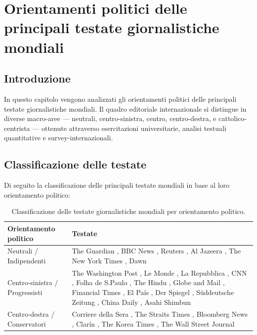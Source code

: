 \chapter{Orientamenti politici delle principali testate giornalistiche mondiali}
\label{chap:orientamenti_press}

\section{Introduzione}
In questo capitolo vengono analizzati gli orientamenti politici delle principali testate giornalistiche mondiali. Il quadro editoriale internazionale si distingue in diverse macro-aree — neutrali, centro-sinistra, centro, centro-destra, e cattolico-centrista — ottenute attraverso esercitazioni universitarie, analisi testuali quantitative e \gls{survey-internazionali}.

\section{Classificazione delle testate}
Di seguito la classificazione delle principali testate mondiali in base al loro orientamento politico:

\begin{table}[h]
  \centering
  \begin{tabular}{|p{5cm}|p{10cm}|}
    \hline
    \textbf{Orientamento politico} & \textbf{Testate} \\
    \hline
    Neutrali / Indipendenti & The Guardian \cite{theguardian}, BBC News \cite{bbcnews}, Reuters \cite{reuters}, Al Jazeera \cite{aljazeera}, The New York Times \cite{thenewyorktimes}, Dawn \cite{dawn} \\
    \hline
    Centro-sinistra / Progressisti & The Washington Post \cite{thewashingtonpost}, Le Monde \cite{lemonde}, La Repubblica \cite{larepubblica}, CNN \cite{cnn}, Folha de S.Paulo \cite{folhadespaulo}, The Hindu \cite{thehindu}, Globe and Mail \cite{globeandmail}, Financial Times \cite{financialtimes}, El País \cite{elpais}, Der Spiegel \cite{derspiegel}, Süddeutsche Zeitung \cite{suddeutschezeitung}, China Daily \cite{chinadaily}, Asahi Shimbun \cite{asahishimbun} \\
    \hline
    Centro-destra / Conservatori & Corriere della Sera \cite{corrieredellasera}, The Straits Times \cite{thestraitstimes}, Bloomberg News \cite{bloombergnews}, Clarín \cite{clarín}, The Korea Times \cite{thekoreatimes}, The Wall Street Journal \cite{thewallstreetjournal} \\
    \hline
  \end{tabular}
  \caption{Classificazione delle testate giornalistiche mondiali per orientamento politico.}
  \label{tab:classificazione_testate}
\end{table}

